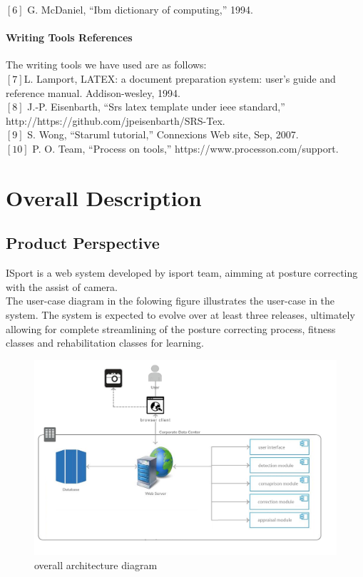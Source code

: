 \documentclass[16pt]{scrreprt}
\begin{document}
$[6]$ G. McDaniel, “Ibm dictionary of computing,” 1994.
\subsubsection{Writing Tools References}
The writing tools we have used are as follows:\\

$[7]$L. Lamport, LATEX: a document preparation system: user’s guide and reference manual. Addison-wesley, 1994.\\

$[8]$ J.-P. Eisenbarth, “Srs latex template under ieee standard,” \\http://https://github.com/jpeisenbarth/SRS-Tex.\\

$[9]$ S. Wong, “Staruml tutorial,” Connexions Web site, Sep, 2007.\\

$[10]$ P. O. Team, “Process on tools,” https://www.processon.com/support.

\chapter{Overall Description}
\label{Overall Description}

\section{Product Perspective}

ISport is a web system developed by isport team, aimming at posture correcting with the assist of camera.\\

The user-case diagram in the folowing figure illustrates the user-case in the system. The system is expected to evolve over at least three releases, ultimately allowing for complete streamlining of the posture correcting process, fitness classes and rehabilitation classes for learning.

\begin{figure}[H]
    \centering
    \includegraphics[width=1.0\textwidth]{figures/architecturediagram.png}
    \caption{overall architecture diagram}
\end{figure}
\end{document}
